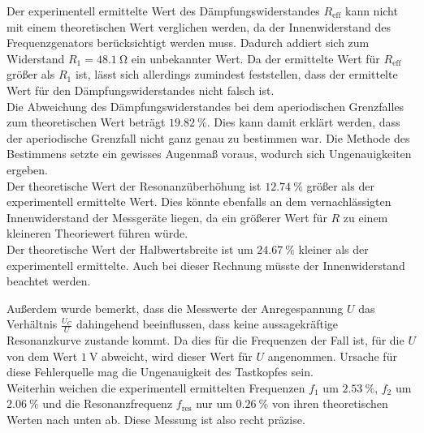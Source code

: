 Der experimentell ermittelte Wert des Dämpfungswiderstandes $R_\text{eff}$ kann
nicht mit einem theoretischen Wert verglichen werden, da der Innenwiderstand 
des Frequenzgenators berücksichtigt werden muss. Dadurch addiert sich zum Widerstand
$R_1 = \SI{48.1}{\ohm}$ ein unbekannter Wert. Da der ermittelte Wert für $R_\text{eff}$
größer als $R_1$ ist, lässt sich allerdings zumindest feststellen, dass der ermittelte
Wert für den Dämpfungswiderstandes nicht falsch ist. \\
Die Abweichung des Dämpfungswiderstandes bei dem aperiodischen Grenzfalles zum 
theoretischen Wert beträgt $\SI{19.82}{\percent}$. Dies kann damit erklärt werden, 
dass der aperiodische Grenzfall nicht ganz genau zu bestimmen war. Die Methode 
des Bestimmens setzte ein gewisses Augenmaß voraus, wodurch sich Ungenauigkeiten 
ergeben.\\
Der theoretische Wert der Resonanzüberhöhung ist $\SI{12.74}{\percent}$ größer als der 
experimentell ermittelte Wert. Dies könnte ebenfalls an dem vernachlässigten Innenwiderstand
der Messgeräte liegen, da ein größerer Wert für $R$ zu einem kleineren Theoriewert 
führen würde. \\
Der theoretische Wert der Halbwertsbreite ist um $\SI{24.67}{\percent}$ kleiner als der 
experimentell ermittelte. Auch bei dieser Rechnung müsste der Innenwiderstand
beachtet werden.

Außerdem wurde bemerkt, dass die Messwerte der Anregespannung $U$ das Verhältnis $\frac{U_C}{U}$
dahingehend beeinflussen, dass keine aussagekräftige Resonanzkurve zustande kommt. Da dies
für die Frequenzen der Fall ist, für die $U$ von dem Wert $\SI{1}{\volt}$ abweicht, wird
dieser Wert für $U$ angenommen. Ursache für diese Fehlerquelle mag die Ungenauigkeit des Tastkopfes
sein. \\
Weiterhin weichen die experimentell ermittelten Frequenzen $f_1$ um $\SI{2.53}{\percent}$,
$f_2$ um $\SI{2.06}{\percent}$ und die Resonanzfrequenz $f_\text{res}$ nur um $\SI{0.26}{\percent}$
von ihren theoretischen Werten nach unten ab. Diese Messung ist also recht präzise.
